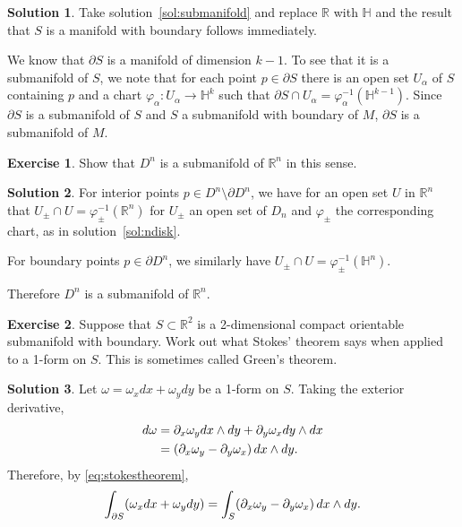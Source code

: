 \documentclass[11pt, a4paper]{report}
\theoremstyle{definition}
\newtheorem{exercise}{Exercise}[part]
\newtheorem{solution}{Solution}[part]
\newenvironment{ex}{\begin{exercise}}{\end{exercise}\pagebreak[1]}
\newenvironment{sol}{\begin{solution}}{\end{solution}\pagebreak[3]}
\renewcommand*{\d}{\ensuremath\mathop{}\mathopen{}d}
\begin{document}
\begin{sol}

Take solution~\ref{sol:submanifold} and replace $\mathbb{R}$ with $\mathbb{H}$ and the result that $S$ is a manifold with boundary follows immediately.

We know that $\partial S$ is a manifold of dimension $k - 1$. To see that it is a submanifold of $S$, we note that for each point $p \in \partial S$ there is an open set $U_\alpha$ of $S$ containing $p$ and a chart $\varphi_\alpha: U_\alpha \to \mathbb{H}^k$ such that $\partial S \cap U_\alpha = \varphi_\alpha^{-1}(\mathbb{H}^{k - 1})$. Since $\partial S$ is a submanifold of $S$ and $S$ a submanifold with boundary of $M$, $\partial S$ is a submanifold of $M$.

\end{sol}

\begin{ex}

Show that $D^n$ is a submanifold of $\mathbb{R}^n$ in this sense.

\end{ex}

\begin{sol}

For interior points $p \in D^n \setminus \partial D^n$, we have for an open set $U$ in $\mathbb{R}^n$ that $U_\pm \cap U = \varphi_\pm^{-1}(\mathbb{R}^n)$ for $U_\pm$ an open set of $D_n$ and $\varphi_\pm$ the corresponding chart, as in solution~\ref{sol:ndisk}.

For boundary points $p \in \partial D^n$, we similarly have $U_\pm \cap U = \varphi_\pm^{-1}(\mathbb{H}^n)$.

Therefore $D^n$ is a submanifold of $\mathbb{R}^n$.

\end{sol}

\begin{ex}

Suppose that $S \subset \mathbb{R}^2$ is a 2-dimensional compact orientable submanifold with boundary.
Work out what Stokes' theorem says when applied to a 1-form on $S$.
This is sometimes called Green's theorem.

\end{ex}

\begin{sol}

Let $\omega = \omega_x dx + \omega_y dy$ be a 1-form on $S$. Taking the exterior derivative,
\begin{align*}
    d\omega &= \partial_x \omega_y dx \wedge dy + \partial_y \omega_x dy \wedge dx \\
            &= (\partial_x \omega_y - \partial_y \omega_x) \d x \wedge dy.
\end{align*}
Therefore, by \ref{eq:stokestheorem}, %
\[
    \int_{\partial S} (\omega_x dx + \omega_y dy) =
        \int_S (\partial_x \omega_y - \partial_y \omega_x) \d x \wedge dy.
\]

\end{sol}
\end{document}
